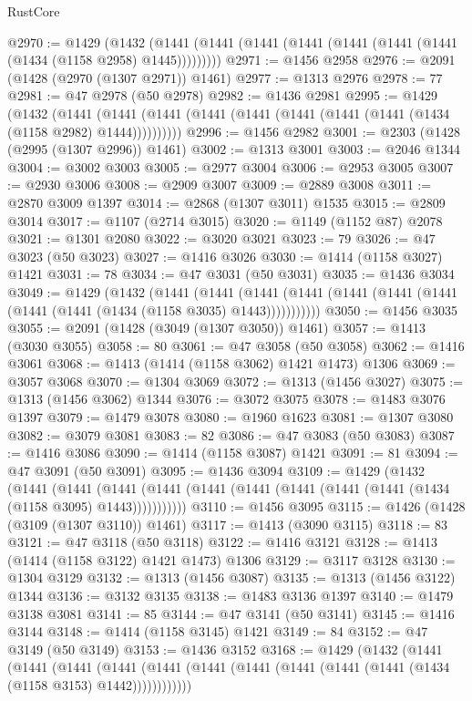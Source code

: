 \begin{lexlean}{RustCore}
\begin{coremodule}
@2970 := @1429
    (@1432 (@1441 (@1441 (@1441 (@1441 (@1441 (@1441 (@1441 (@1434 (@1158 @2958) @1445)))))))))
@2971 := @1456 @2958
@2976 := @2091 (@1428 (@2970 (@1307 @2971)) @1461)
@2977 := @1313 @2976
@2978 := 77
@2981 := @47 @2978 (@50 @2978)
@2982 := @1436 @2981
@2995 := @1429
    (@1432
      (@1441 (@1441 (@1441 (@1441 (@1441 (@1441 (@1441 (@1441 (@1434 (@1158 @2982) @1444))))))))))
@2996 := @1456 @2982
@3001 := @2303 (@1428 (@2995 (@1307 @2996)) @1461)
@3002 := @1313 @3001
@3003 := @2046 @1344
@3004 := @3002 @3003
@3005 := @2977 @3004
@3006 := @2953 @3005
@3007 := @2930 @3006
@3008 := @2909 @3007
@3009 := @2889 @3008
@3011 := @2870 @3009 @1397
@3014 := @2868 (@1307 @3011) @1535
@3015 := @2809 @3014
@3017 := @1107 (@2714 @3015)
@3020 := @1149 (@1152 @87) @2078
@3021 := @1301 @2080
@3022 := @3020 @3021
@3023 := 79
@3026 := @47 @3023 (@50 @3023)
@3027 := @1416 @3026
@3030 := @1414 (@1158 @3027) @1421
@3031 := 78
@3034 := @47 @3031 (@50 @3031)
@3035 := @1436 @3034
@3049 := @1429
    (@1432
      (@1441
        (@1441
          (@1441 (@1441 (@1441 (@1441 (@1441 (@1441 (@1441 (@1434 (@1158 @3035) @1443)))))))))))
@3050 := @1456 @3035
@3055 := @2091 (@1428 (@3049 (@1307 @3050)) @1461)
@3057 := @1413 (@3030 @3055)
@3058 := 80
@3061 := @47 @3058 (@50 @3058)
@3062 := @1416 @3061
@3068 := @1413 (@1414 (@1158 @3062) @1421 @1473) @1306
@3069 := @3057 @3068
@3070 := @1304 @3069
@3072 := @1313 (@1456 @3027)
@3075 := @1313 (@1456 @3062) @1344
@3076 := @3072 @3075
@3078 := @1483 @3076 @1397
@3079 := @1479 @3078
@3080 := @1960 @1623
@3081 := @1307 @3080
@3082 := @3079 @3081
@3083 := 82
@3086 := @47 @3083 (@50 @3083)
@3087 := @1416 @3086
@3090 := @1414 (@1158 @3087) @1421
@3091 := 81
@3094 := @47 @3091 (@50 @3091)
@3095 := @1436 @3094
@3109 := @1429
    (@1432
      (@1441
        (@1441
          (@1441 (@1441 (@1441 (@1441 (@1441 (@1441 (@1441 (@1434 (@1158 @3095) @1443)))))))))))
@3110 := @1456 @3095
@3115 := @1426 (@1428 (@3109 (@1307 @3110)) @1461)
@3117 := @1413 (@3090 @3115)
@3118 := 83
@3121 := @47 @3118 (@50 @3118)
@3122 := @1416 @3121
@3128 := @1413 (@1414 (@1158 @3122) @1421 @1473) @1306
@3129 := @3117 @3128
@3130 := @1304 @3129
@3132 := @1313 (@1456 @3087)
@3135 := @1313 (@1456 @3122) @1344
@3136 := @3132 @3135
@3138 := @1483 @3136 @1397
@3140 := @1479 @3138 @3081
@3141 := 85
@3144 := @47 @3141 (@50 @3141)
@3145 := @1416 @3144
@3148 := @1414 (@1158 @3145) @1421
@3149 := 84
@3152 := @47 @3149 (@50 @3149)
@3153 := @1436 @3152
@3168 := @1429
    (@1432
      (@1441
        (@1441
          (@1441
            (@1441 (@1441 (@1441 (@1441 (@1441 (@1441 (@1441 (@1434 (@1158 @3153) @1442))))))))))))

\end{coremodule}
\end{lexlean}
